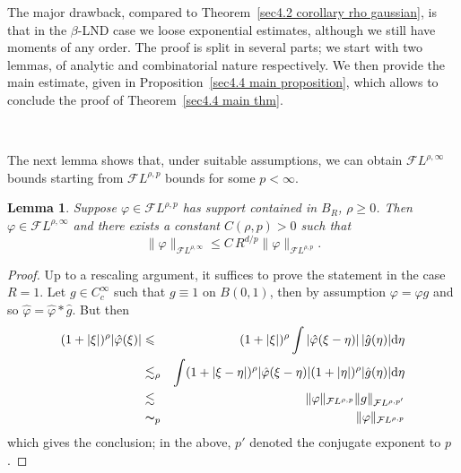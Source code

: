 \documentclass[10pt]{article}
\newcommand{\mathd}{\mathrm{d}}
\newtheorem{lemma}[theorem]{Lemma}
\begin{document}
The major drawback, compared to Theorem~\ref{sec4.2 corollary rho gaussian},
is that in the $\beta$\mbox{-}LND case we loose exponential estimates,
although we still have moments of any order. The proof is split in several
parts; we start with two lemmas, of analytic and combinatorial nature
respectively. We then provide the main estimate, given in
Proposition~\ref{sec4.4 main proposition}, which allows to conclude the proof
of Theorem~\ref{sec4.4 main thm}.

\

The next lemma shows that, under suitable assumptions, we can obtain
$\mathcal{F} L^{\rho, \infty}$ bounds starting from $\mathcal{F} L^{\rho, p}$
bounds for some $p < \infty$.

\begin{lemma}
  \label{sec4.4 analytic lemma}Suppose $\varphi \in \mathcal{F} L^{\rho, p}$
  has support contained in $B_R$, $\rho \geqslant 0$. Then $\varphi \in
  \mathcal{F} L^{\rho, \infty}$ and there exists a constant $C (\rho, p) > 0$
  such that
  \[ \| \varphi \|_{\mathcal{F} L^{\rho, \infty}} \leqslant C \, R^{d / p} \|
     \varphi \|_{\mathcal{F} L^{\rho, p}} . \]
\end{lemma}

\begin{proof}
  Up to a rescaling argument, it suffices to prove the statement in the case
  $R = 1$. Let $g \in C^{\infty}_c$ such that $g \equiv 1$ on $B (0, 1)$, then
  by assumption $\varphi = \varphi g$ and so $\hat{\varphi} = \hat{\varphi}
  \ast \hat{g}$. But then
  \begin{eqnarray*}
    (1 + | \xi |)^{\rho} | \hat{\varphi} (\xi) | & \leqslant & (1 + | \xi
    |)^{\rho} \int | \hat{\varphi} (\xi - \eta) | \, | \hat{g} (\eta) | \mathd
    \eta\\
    & \lesssim_{\rho} & \int (1 + | \xi - \eta |)^{\rho} | \hat{\varphi} (\xi
    - \eta) | (1 + | \eta |)^{\rho} | \hat{g} (\eta) | \mathd \eta\\
    & \lesssim & \| \varphi \|_{\mathcal{F} L^{\rho, p}} \| g \|_{\mathcal{F}
    L^{\rho, p'}}\\
    & \thicksim_p & \| \varphi \|_{\mathcal{F} L^{\rho, p}}
  \end{eqnarray*}
  which gives the conclusion; in the above, $p'$ denoted the conjugate
  exponent to $p$.
\end{proof}
\end{document}
